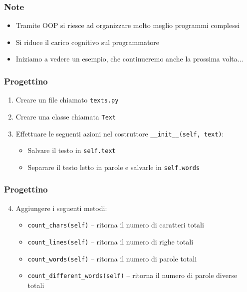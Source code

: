 \begin{exampleframe}
    \frametitle{Note}

    \begin{itemize}
        \item Tramite OOP si riesce ad organizzare molto meglio programmi complessi
        \item Si riduce il carico cognitivo sul programmatore

        \bigskip
        \item Iniziamo a vedere un esempio, che continueremo anche la prossima volta...
    \end{itemize}
\end{exampleframe}

\begin{exerciseframe}
    \frametitle{Progettino}

    \begin{enumerate}
        \item Creare un file chiamato \texttt{texts.py}
        \item Creare una classe chiamata \texttt{Text}

        \pause
        \bigskip
        \item Effettuare le seguenti azioni nel costruttore \texttt{\_\_init\_\_(self, text)}:
        \begin{itemize}
            \item Salvare il testo in \texttt{self.text}
            \item Separare il testo letto in parole e salvarle in \texttt{self.words}
        \end{itemize}
    \end{enumerate}
\end{exerciseframe}

\begin{exerciseframe}
    \frametitle{Progettino}

    \begin{enumerate}
        \setcounter{enumi}{3}
        \item Aggiungere i seguenti metodi:
        \begin{itemize}
            \item \texttt{count\_chars(self)} -- ritorna il numero di caratteri totali
            \item \texttt{count\_lines(self)} -- ritorna il numero di righe totali
            \item \texttt{count\_words(self)} -- ritorna il numero di parole totali
            \item \texttt{count\_different\_words(self)} -- ritorna il numero di parole diverse totali
        \end{itemize}
    \end{enumerate}
\end{exerciseframe}

